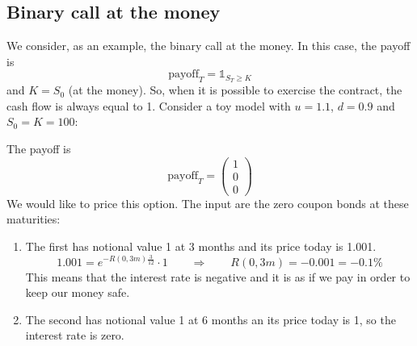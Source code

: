 \subsection{Binary call at the money}
We consider, as an example, the binary call at the money. In this case, the payoff is 
\begin{equation}
    \mbox{payoff}_T = \mathds{1}_{S_T\ge K}
\end{equation}
and $K=S_0$ (at the money). So, when it is possible to exercise the contract, the cash flow is always equal to 1. Consider a toy model with $u=1.1$, $d=0.9$ and $S_0=K=100$:
\begin{center}
\end{center}
The payoff is 
\begin{equation}
    \mbox{payoff}_T = 
    \left( 
    \begin{matrix}
    1 \\ 0 \\ 0
    \end{matrix}
    \right)
\end{equation}
We would like to price this option. The input are the zero coupon bonds at these maturities:
\begin{enumerate}
    \item The first has notional value 1 at 3 months and 
    its price today is 1.001. 
    \begin{equation*}
        1.001 = e^{-R(0,3m)\frac{3}{12}}\cdot1 \qquad\Rightarrow\qquad R(0,3m) = -0.001 = -0.1\%
    \end{equation*}
    This means that the interest rate is negative and it is as if we pay in order to keep our money safe.
    \item The second has notional value 1 at 6 months an its price today is 1, so the interest rate is zero.
\end{enumerate}
